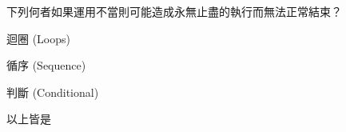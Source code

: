 \ifx\ntpcNinetyTwo\undefined[92學年基北區] \fi
下列何者如果運用不當則可能造成永無止盡的執行而無法正常結束？
  \begin{optionlist}
  \item 迴圈 (Loops)\label{ntpc-92-a4}
  \item 循序 (Sequence)
  \item 判斷 (Conditional)
  \item 以上皆是
  \end{optionlist}